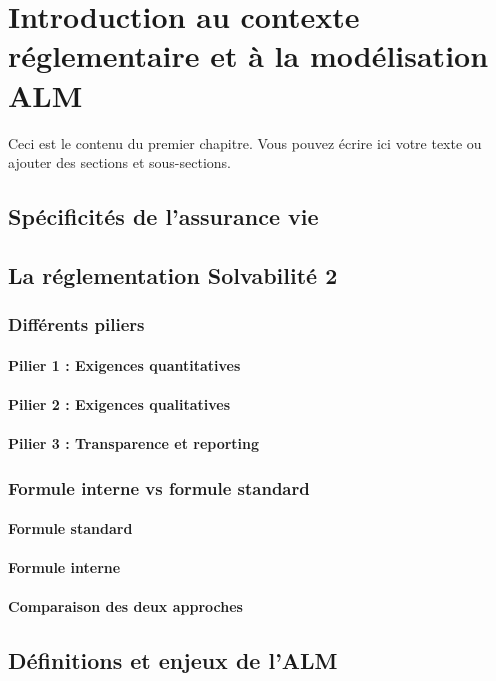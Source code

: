 \chapter{Introduction au contexte réglementaire et à la modélisation ALM}
Ceci est le contenu du premier chapitre. Vous pouvez écrire ici votre texte ou ajouter des sections et sous-sections.

\section{Spécificités de l'assurance vie}

\section{La réglementation Solvabilité 2}
\subsection{Différents piliers}
\subsubsection{Pilier 1 : Exigences quantitatives}
\subsubsection{Pilier 2 : Exigences qualitatives}
\subsubsection{Pilier 3 : Transparence et reporting}

\subsection{Formule interne vs formule standard}
\subsubsection{Formule standard}
\subsubsection{Formule interne}
\subsubsection{Comparaison des deux approches}

\section{Définitions et enjeux de l’ALM}
